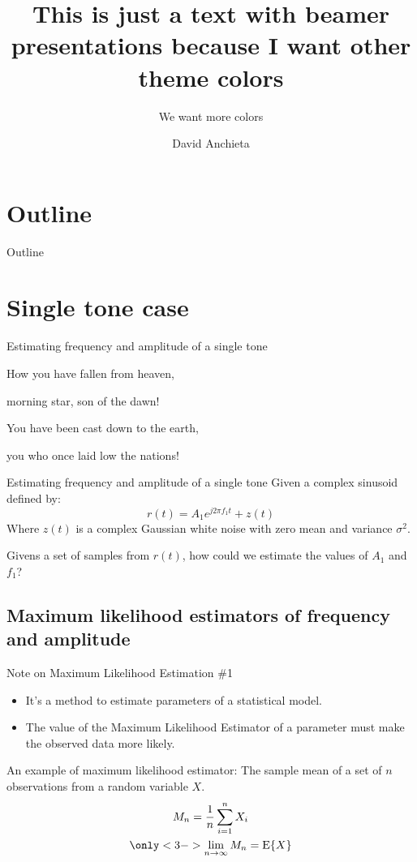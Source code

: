 ﻿\documentclass[mathserif]{beamer}
\title[Beamer themes] %
{\textbf{This is just a text with beamer presentations because I want other theme colors}}
\subtitle{We want more colors}
\author{David Anchieta}
\begin{document}
	\frame{\titlepage}

	\section*{Outline}
	\begin{frame}{Outline}		
		\tableofcontents
	\end{frame}
	
	\section{Single tone case}
	\begin{frame}{Estimating frequency and amplitude of a single tone}
		\begin{theorem}
			How you have fallen from heaven,
			
			morning star, son of the dawn!
			
			You have been cast down to the earth,

			you who once laid low the nations!
			
		\end{theorem}
		
	\end{frame}\begin{frame}{Estimating frequency and amplitude of a single tone}
		Given a complex sinusoid defined by:
		\begin{equation*}
			r(t) = A_{1}e^{j2\pi f_1 t} + z(t)
		\end{equation*}
		Where $z(t)$ is a complex Gaussian white noise with zero mean and variance $\sigma^2$.
		
		Givens a set of samples from $r(t)$, how could we estimate the values of $A_1$ and $f_1$?	
		
	\end{frame}
	
	
	\subsection{Maximum likelihood estimators of frequency and amplitude}
	
	\begin{frame}{Note on Maximum Likelihood Estimation \#1}
		\begin{itemize}
			\item It's a method to estimate parameters of a statistical model.
			\item The value of the Maximum Likelihood Estimator of a parameter must make the observed data more likely.
		\end{itemize}
		\pause
		An example of maximum likelihood estimator: The sample mean of a set of $n$ observations from a random variable $X$.
		\begin{gather*}
			M_n = \frac{1}{n}\sum_{i=1}^nX_i\\
			\only<3->{ \lim_{n \to \infty}M_n = \mathrm{E}\{X\}}
		\end{gather*}
	\end{frame}
	
\end{document}
